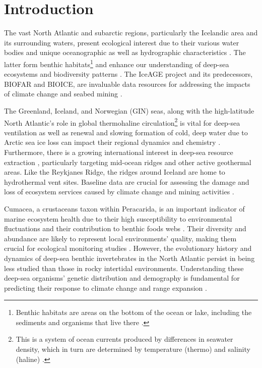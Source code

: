 \section{Introduction}\label{introduction}
The vast North Atlantic and subarctic regions, particularly the Icelandic area and its surrounding waters, present ecological interest due to their various water bodies and unique oceanographic as well as hydrographic characteristics \citep{schnurr_composition_2014, meisner_benthic_2014, uhlir_adding_2021}. The latter form {benthic habitats}\footnote{Benthic habitats are areas on the bottom of the ocean or lake, including the sediments and organisms that live there \citep{levin2009ecological}.} and enhance our understanding of deep-sea ecosystems and biodiversity patterns \citep{rogers2007corals, danovaro2008exponential, meisner_benthic_2014, uhlir_adding_2021}. The IceAGE project and its predecessors, BIOFAR and BIOICE, are invaluable data resources for addressing the impacts of climate change and seabed mining \citep{meisner_prefacebiodiversity_2018}. 

The Greenland, Iceland, and Norwegian (GIN) seas, along with the high-latitude North Atlantic's role in global {thermohaline circulation}\footnote{This is a system of ocean currents produced by differences in seawater density, which in turn are determined by temperature (thermo) and salinity (haline) \citep{talley2013closure}.} is vital for deep-sea ventilation as well as renewal \citep{johannessen_relationship_1994} and slowing formation of cold, deep water due to Arctic sea ice loss can impact their regional dynamics and chemistry \citep{meisner_prefacebiodiversity_2018}. Furthermore, there is a growing international interest in deep-sea resource extraction \citep{mengerink_call_2014}, particularly targeting mid-ocean ridges and other active geothermal areas. Like the Reykjanes Ridge, the ridges around Iceland are home to hydrothermal vent sites. Baseline data are crucial for assessing the damage and loss of ecosystem services caused by climate change and mining activities \citep{meisner_prefacebiodiversity_2018}. 

Cumacea, a crustaceans taxon within Peracarida, is an important indicator of marine ecosystem health due to their high susceptibility to environmental fluctuations \citep{stransky_diversity_2010} and their contribution to benthic foods webs \citep{rehm2009cumacea}. Their diversity and abundance are likely to represent local environments' quality, making them crucial for ecological monitoring studies \citep{hessler1967faunal}. However, the evolutionary history and dynamics of deep-sea benthic invertebrates in the North Atlantic persist in being less studied than those in rocky intertidal environments. Understanding these deep-sea organisms' genetic distribution and demography is fundamental for predicting their response to climate change and range expansion \citep{jennings_phylogeographic_2014}.   

